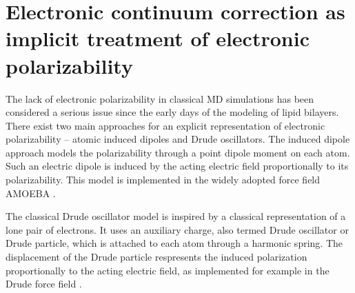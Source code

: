 \section{Electronic continuum correction as implicit treatment of electronic polarizability}
\label{section:ecc}

The lack of electronic polarizability in classical MD simulations
has been considered a serious issue since the early days of the modeling of lipid bilayers. 
There exist two main approaches for an explicit representation of electronic polarizability -- atomic induced dipoles and Drude oscillators.
The induced dipole approach models the polarizability through a point dipole moment on each atom.
Such an electric dipole is induced by the acting electric field proportionally to its polarizability. 
This model is implemented in the widely adopted force field AMOEBA \citep{amoeba06, amoeba10, amoeba13}.

The classical Drude oscillator model is inspired by a classical representation of a lone pair of electrons. 
It uses an auxiliary charge,
also termed Drude oscillator or Drude particle, 
which is attached to each atom through a harmonic spring.
The displacement of the Drude particle respresents the induced polarization proportionally to the acting electric field,
as implemented for example in the Drude force field \citep{lemkul2016empirical}. 

